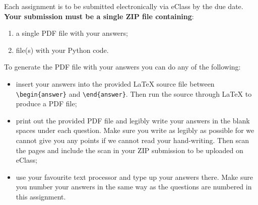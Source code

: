 \documentclass{article}
\begin{document}
\medskip

Each assignment is to be submitted electronically via eClass by the due date.
\textbf{Your submission must be a single ZIP file containing}:
\begin{enumerate}
\item a single PDF file with your answers;
\item file(s) with your Python code.
\end{enumerate}

To generate the PDF file with your answers you can do any of the following:

\begin{itemize}
\item
insert your answers into the provided \LaTeX{} source file between \verb|\begin{answer}| and \verb|\end{answer}|. Then run the source through \LaTeX{} to produce a PDF file;

\item print out the provided PDF file and legibly write your answers in the blank spaces under each question. Make sure you write as legibly as possible for we cannot give you any points if we cannot read your hand-writing. Then scan the pages and include the scan in your ZIP submission to be uploaded on eClass;

\item use your favourite text processor and type up your answers there. Make sure you number your answers in the same way as the questions are numbered in this assignment.
\end{itemize}
\end{document}
